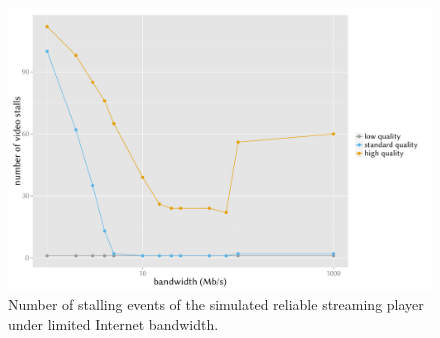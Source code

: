 \documentclass{beamer}
\begin{document}
\begin{frame}
\begin{columns}
		\begin{figure}
			\includegraphics[width=\columnwidth]{../../chapters/06-mobilestreamingmeasurements/images/R-ltesim-bwseries-numstalls.pdf}
			\caption{Number of stalling events of the simulated reliable streaming player under limited Internet bandwidth.}
		\end{figure}
	\end{columns}
\end{frame}
\end{document}

